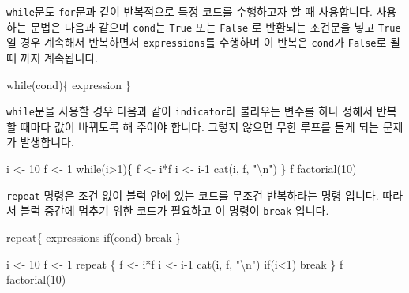 \documentclass[
  a4paper,
]{book}
\newenvironment{Shaded}{\begin{snugshade}}{\end{snugshade}}
\newcommand{\ControlFlowTok}[1]{\textcolor[rgb]{0.00,0.23,0.31}{#1}}
\newcommand{\DecValTok}[1]{\textcolor[rgb]{0.68,0.00,0.00}{#1}}
\newcommand{\FunctionTok}[1]{\textcolor[rgb]{0.28,0.35,0.67}{#1}}
\newcommand{\NormalTok}[1]{\textcolor[rgb]{0.00,0.23,0.31}{#1}}
\newcommand{\OtherTok}[1]{\textcolor[rgb]{0.00,0.23,0.31}{#1}}
\newcommand{\SpecialCharTok}[1]{\textcolor[rgb]{0.37,0.37,0.37}{#1}}
\newcommand{\StringTok}[1]{\textcolor[rgb]{0.13,0.47,0.30}{#1}}
\begin{document}
\texttt{while}문도 \texttt{for}문과 같이 반복적으로 특정 코드를
수행하고자 할 때 사용합니다. 사용하는 문법은 다음과 같으며
\texttt{cond}는 \texttt{True} 또는 \texttt{False} 로 반환되는 조건문을
넣고 \texttt{True} 일 경우 계속해서 반복하면서 \texttt{expressions}를
수행하며 이 반복은 \texttt{cond}가 \texttt{False}로 될 때 까지
계속됩니다.

\begin{Shaded}
\begin{Highlighting}[]
\ControlFlowTok{while}\NormalTok{(cond)\{}
\NormalTok{  expression}
\NormalTok{\}}
\end{Highlighting}
\end{Shaded}

\texttt{while}문을 사용할 경우 다음과 같이 \texttt{indicator}라 불리우는
변수를 하나 정해서 반복 할 때마다 값이 바뀌도록 해 주어야 합니다. 그렇지
않으면 무한 루프를 돌게 되는 문제가 발생합니다.

\begin{Shaded}
\begin{Highlighting}[]
\NormalTok{i }\OtherTok{\textless{}{-}} \DecValTok{10}
\NormalTok{f }\OtherTok{\textless{}{-}} \DecValTok{1}
\ControlFlowTok{while}\NormalTok{(i}\SpecialCharTok{\textgreater{}}\DecValTok{1}\NormalTok{)\{}
\NormalTok{  f }\OtherTok{\textless{}{-}}\NormalTok{ i}\SpecialCharTok{*}\NormalTok{f}
\NormalTok{  i }\OtherTok{\textless{}{-}}\NormalTok{ i}\DecValTok{{-}1}
  \FunctionTok{cat}\NormalTok{(i, f, }\StringTok{"}\SpecialCharTok{\textbackslash{}n}\StringTok{"}\NormalTok{)}
\NormalTok{\}}
\NormalTok{f}
\FunctionTok{factorial}\NormalTok{(}\DecValTok{10}\NormalTok{)}
\end{Highlighting}
\end{Shaded}

\texttt{repeat} 명령은 조건 없이 블럭 안에 있는 코드를 무조건 반복하라는
명령 입니다. 따라서 블럭 중간에 멈추기 위한 코드가 필요하고 이 명령이
\texttt{break} 입니다.

\begin{Shaded}
\begin{Highlighting}[]
\ControlFlowTok{repeat}\NormalTok{\{}
\NormalTok{  expressions}
  \ControlFlowTok{if}\NormalTok{(cond) }\ControlFlowTok{break}
\NormalTok{\}}

\NormalTok{i }\OtherTok{\textless{}{-}} \DecValTok{10}
\NormalTok{f }\OtherTok{\textless{}{-}} \DecValTok{1}
\ControlFlowTok{repeat}\NormalTok{ \{}
\NormalTok{  f }\OtherTok{\textless{}{-}}\NormalTok{ i}\SpecialCharTok{*}\NormalTok{f}
\NormalTok{  i }\OtherTok{\textless{}{-}}\NormalTok{ i}\DecValTok{{-}1}
  \FunctionTok{cat}\NormalTok{(i, f, }\StringTok{"}\SpecialCharTok{\textbackslash{}n}\StringTok{"}\NormalTok{)}
  \ControlFlowTok{if}\NormalTok{(i}\SpecialCharTok{\textless{}}\DecValTok{1}\NormalTok{) }\ControlFlowTok{break}
\NormalTok{\}}
\NormalTok{f}
\FunctionTok{factorial}\NormalTok{(}\DecValTok{10}\NormalTok{)}
\end{Highlighting}
\end{Shaded}
\end{document}
